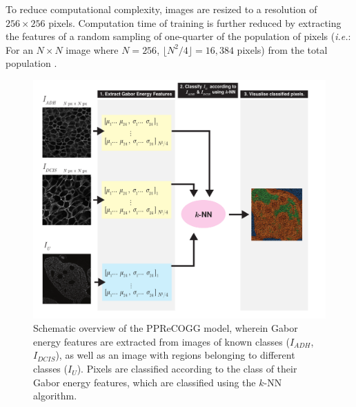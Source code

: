 To reduce computational complexity, images are resized to a resolution of
$256\times256$ pixels. Computation time of training is further reduced by
extracting the features of a random sampling of one-quarter of the population of pixels 
(\emph{i.e.}: For an $N \times N$ image where $N=256$, $\lfloor N^2/4 \rfloor = 16,384$ pixels) from the total population .

\begin{figure}[ht!]
	\centering
	\includegraphics[width=180mm]{figures/pprecogg_summary.pdf}
	\caption{Schematic overview of the PPReCOGG model, wherein Gabor energy features are extracted from images of known classes ($I_{ADH}$, $I_{DCIS}$), as well as an image with regions belonging to different classes ($I_U$). Pixels are classified according to the class of their Gabor energy features, which are classified using the $k$-NN algorithm. \label{pprecogg_summary}}

\end{figure}







